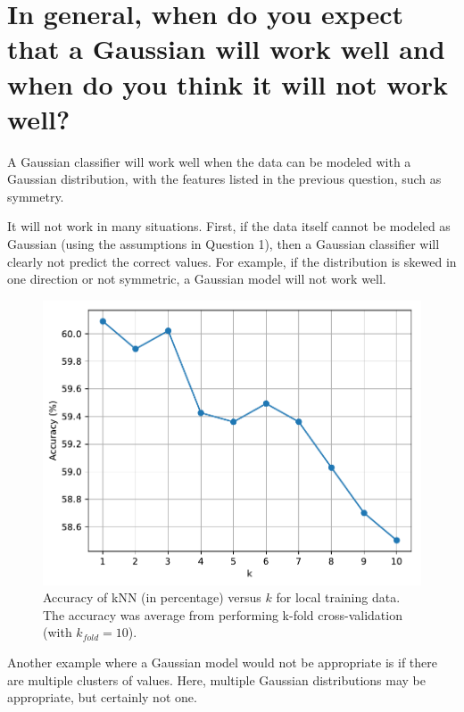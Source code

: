 \documentclass[a4paper,titlepage]{article}
\begin{document}
	\section{In general, when do you expect that a Gaussian will work well and when do you think it will not work well?}
	
	A Gaussian classifier will work well when the data can be modeled with a Gaussian distribution, with the features listed in the previous question, such as symmetry.
	
	It will not work in many situations. First, if the data itself cannot be modeled as Gaussian (using the assumptions in Question 1), then a Gaussian classifier will clearly not predict the correct values. For example, if the distribution is skewed in one direction or not symmetric, a Gaussian model will not work well.
	
	\begin{figure}[!htb]
		\centering
		\includegraphics[width=\columnwidth]{plots/knn_accuracy_training.pdf}
		\caption
		{Accuracy of kNN (in percentage) versus $k$ for local training data. The accuracy was average from performing k-fold cross-validation (with $k_{fold} = 10$).}
		\label{fig:knn_accuracy_training}
	\end{figure}
	
	Another example where a Gaussian model would not be appropriate is if there are multiple clusters of values. Here, multiple Gaussian distributions may be appropriate, but certainly not one.
	
\end{document}
